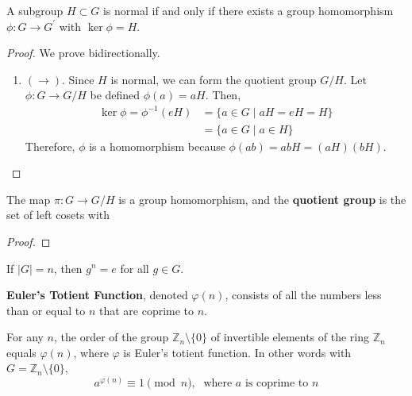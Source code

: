   \begin{lemma} 
    A subgroup $H \subset G$ is normal if and only if there exists a group homomorphism $\phi: G \rightarrow G^\prime$ with $\ker{\phi} = H$. 
  \end{lemma}
  \begin{proof}
    We prove bidirectionally. 
    \begin{enumerate}
      \item $(\rightarrow)$. Since $H$ is normal, we can form the quotient group $G/H$. Let $\phi: G \rightarrow G/H$ be defined $\phi(a) = aH$. Then, 
      \begin{align}
        \ker{\phi} = \phi^{-1}(eH) & = \{a \in G \mid aH = eH = H \} \\
                                   & = \{a \in G \mid a \in H \}
      \end{align}
      Therefore, $\phi$ is a homomorphism because $\phi(ab) = abH = (aH)(bH)$. 
    \end{enumerate}
  \end{proof}

  \begin{theorem}
    The map $\pi: G \rightarrow G/H$ is a group homomorphism, and the \textbf{quotient group} is the set of left cosets with 
  \end{theorem}
  \begin{proof}
    
  \end{proof} 

  \begin{corollary}
    If $|G| = n$, then $g^{n} = e$ for all $g \in G$. 
  \end{corollary}

  \begin{definition}
    \textbf{Euler's Totient Function}, denoted $\varphi(n)$, consists of all the numbers less than or equal to $n$ that are coprime to $n$. 
  \end{definition}

  \begin{theorem}
    For any $n$, the order of the group $\mathbb{Z}_{n} \setminus \{0\}$ of invertible elements of the ring $\mathbb{Z}_{n}$ equals $\varphi(n)$, where $\varphi$ is Euler's totient function. In other words with $G = \mathbb{Z}_{n} \setminus \{0\}$, 
    \begin{equation}
      a^{\varphi(n)} \equiv 1 \pmod{n}, \; \text{ where $a$ is coprime to $n$}
    \end{equation}
  \end{theorem}

